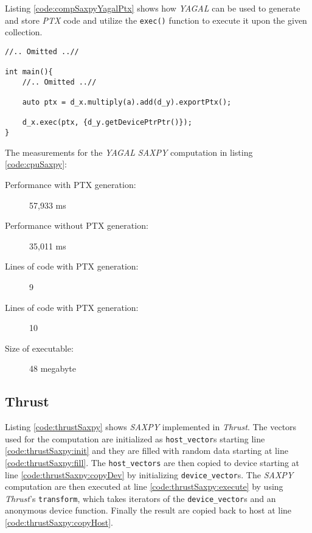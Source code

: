 Listing \ref{code:compSaxpyYagalPtx} shows how \textit{YAGAL} can be used to generate and store \textit{PTX} code and utilize the \texttt{exec()} function to execute it upon the given collection.

\begin{lstlisting}[caption={\textit{YAGAL} \textit{SAXPY} utilizing \textit{PTX} generation.}, label={code:compSaxpyYagalPtx}]
//.. Omitted ..//

int main(){
    //.. Omitted ..//

    auto ptx = d_x.multiply(a).add(d_y).exportPtx();

    d_x.exec(ptx, {d_y.getDevicePtrPtr()});
}
\end{lstlisting}

The measurements for the \textit{YAGAL} \textit{SAXPY} computation in listing \ref{code:cpuSaxpy}:
\begin{description}
    \item[Performance with PTX generation:] 57,933 ms
    \item[Performance without PTX generation:] 35,011 ms
    \item[Lines of code with PTX generation:] 9 
    \item[Lines of code with PTX generation:] 10 
    \item[Size of executable:] 48 megabyte
\end{description}



\subsection{Thrust}
Listing \ref{code:thrustSaxpy} shows \textit{SAXPY} implemented in \textit{Thrust}. The vectors used for the computation are initialized as \texttt{host\_vector}s starting line \ref{code:thrustSaxpy:init} and they are filled with random data starting at line \ref{code:thrustSaxpy:fill}. The \texttt{host\_vectors} are then copied to device starting at line \ref{code:thrustSaxpy:copyDev} by initializing \texttt{device\_vector}s. The \textit{SAXPY} computation are then executed at line \ref{code:thrustSaxpy:execute} by using \textit{Thrust}'s \texttt{transform}, which takes iterators of the \texttt{device\_vector}s and an anonymous device function. Finally the result are copied back to host at line \ref{code:thrustSaxpy:copyHost}.

